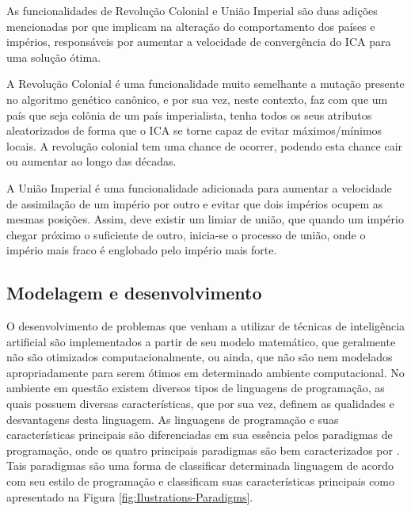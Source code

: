 As funcionalidades de Revolução Colonial e União Imperial são duas adições mencionadas por \cite{roche2011imperialist} que implicam na alteração do comportamento dos países e impérios, responsáveis por aumentar a velocidade de convergência do ICA para uma solução ótima. 

A Revolução Colonial é uma funcionalidade muito semelhante a mutação presente no algoritmo genético canônico, e por sua vez, neste contexto, faz com que um país que seja colônia de um país imperialista, tenha todos os seus atributos aleatorizados de forma que o ICA se torne capaz de evitar máximos/mínimos locais. A revolução colonial tem uma chance de ocorrer, podendo esta chance cair ou aumentar ao longo das décadas.

A União Imperial é uma funcionalidade adicionada para aumentar a velocidade de assimilação de um império por outro e evitar que dois impérios ocupem as mesmas posições. Assim, deve existir um limiar de união, que quando um império chegar próximo o suficiente de outro, inicia-se o processo de união, onde o império mais fraco é englobado pelo império mais forte.
    
    
    
    
    
    
    
    
    
    
    
\subsection{Modelagem e desenvolvimento}
\label{Modelagem e desenvolvimento}

O desenvolvimento de problemas que venham a utilizar de técnicas de inteligência artificial são implementados a partir de seu modelo matemático, que geralmente não são otimizados computacionalmente, ou ainda, que não são nem modelados apropriadamente para serem ótimos em determinado ambiente computacional. No ambiente em questão existem diversos tipos de linguagens de programação, as quais possuem diversas características, que por sua vez, definem as qualidades e desvantagens desta linguagem. As linguagens de programação e suas características principais são diferenciadas em sua essência pelos paradigmas de programação, onde os quatro principais paradigmas são bem caracterizados por  \cite{normark2013overview}. Tais paradigmas são uma forma de classificar determinada linguagem de acordo com seu estilo de programação e classificam suas características principais como apresentado na Figura \ref{fig:Ilustrations-Paradigms}.


